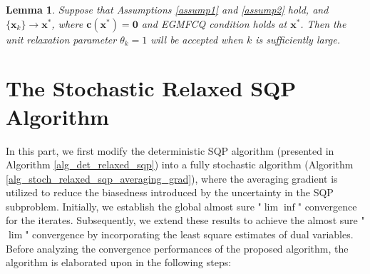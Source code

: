\documentclass[aos]{imsart}
\numberwithin{equation}{section}
\theoremstyle{plain}
\newtheorem{lemma}{Lemma}
\begin{document}
\begin{lemma}
\label{theorem_local_relaxation_parameter}
    Suppose that Assumptions \ref{assump1} and \ref{assump2} hold, and $\{\bm{x}_k\} \to \bm{x}^{*}$, where $\bm{c}(\bm{x}^{*}) = \bm{0}$ and EGMFCQ condition holds at $\bm{x}^{*}$. Then the unit relaxation parameter $\theta_k = 1$ will be accepted when $k$ is sufficiently large.
\end{lemma}



\section{The Stochastic Relaxed SQP Algorithm}
\label{sec:relaxed_stochSQP}
In this part, we first modify the deterministic SQP algorithm (presented in Algorithm \ref{alg_det_relaxed_sqp}) into a fully stochastic algorithm (Algorithm \ref{alg_stoch_relaxed_sqp_averaging_grad}), where the averaging gradient is utilized to reduce the biasedness introduced by the uncertainty in the SQP subproblem. Initially, we establish the global almost sure "$\lim \inf$" convergence for the iterates. 
Subsequently, we extend these results to achieve the almost sure "$\lim$" convergence by incorporating the least square estimates of dual variables. Before analyzing the convergence performances of the proposed algorithm, the algorithm is elaborated upon in the following steps:
\end{document}
